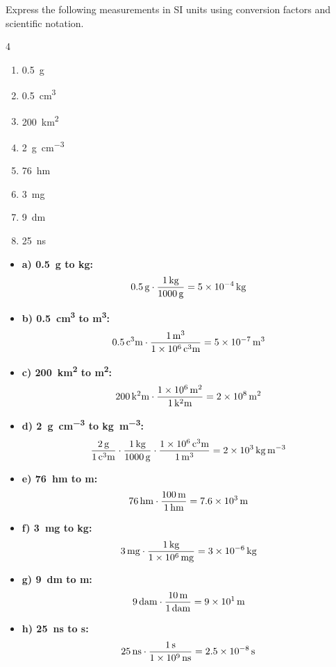 \begin{exercise}
    Express the following measurements in SI units using conversion factors and scientific notation.
    \begin{multicols}{4}
        \begin{enumerate}[label=\letraminuscula]
\item \qty{0.5}{\g}
\item \qty{0.5}{\cubic\centi\metre}
\item \qty{200}{\square\kilo\metre}
\item \qty{2}{\g\per\cubic\centi\metre}
\item \qty{76}{\hecto\m}
\item \qty{3}{\milli\g}
\item \qty{9}{\deca\m}
\item \qty{25}{\nano\s}
        \end{enumerate}
    \end{multicols}

    \begin{solu}
        \begin{itemize}
            \item \textbf{a) \qty{0.5}{\g} to \unit{\kg}:}
            \[ \qty{0.5}{\cancel{\g}} \cdot \frac{\qty{1}{\kg}}{\qty{1000}{\cancel{\g}}} = \qty{5e-4}{\kg} \]
            \item \textbf{b) \qty{0.5}{\cubic\centi\metre} to \unit{\cubic\metre}:}
            \[ \qty{0.5}{\cancel{\cubic\centi\metre}} \cdot \frac{\qty{1}{\cubic\metre}}{\qty{1e6}{\cancel{\cubic\centi\metre}}} = \qty{5e-7}{\cubic\metre} \]
            \item \textbf{c) \qty{200}{\square\kilo\metre} to \unit{\square\metre}:}
            \[ \qty{200}{\cancel{\square\kilo\metre}} \cdot \frac{\qty{1e6}{\square\metre}}{\qty{1}{\cancel{\square\kilo\metre}}} = \qty{2e8}{\square\metre} \]
            \item \textbf{d) \qty{2}{\g\per\cubic\centi\metre} to \unit{\kg\per\cubic\metre}:}
            \[ \frac{\qty{2}{\cancel{\g}}}{\qty{1}{\cancel{\cubic\centi\metre}}} \cdot \frac{\qty{1}{\kg}}{\qty{1000}{\cancel{\g}}} \cdot \frac{\qty{1e6}{\cancel{\cubic\centi\metre}}}{\qty{1}{\cubic\metre}} = \qty{2e3}{\kg\per\cubic\metre} \]
            \item \textbf{e) \qty{76}{\hecto\m} to \unit{\m}:}
            \[ \qty{76}{\cancel{\hecto\m}} \cdot \frac{\qty{100}{\m}}{\qty{1}{\cancel{\hecto\m}}} = \qty{7.6e3}{\m} \]
            \item \textbf{f) \qty{3}{\milli\g} to \unit{\kg}:}
            \[ \qty{3}{\cancel{\milli\g}} \cdot \frac{\qty{1}{\kg}}{\qty{1e6}{\cancel{\milli\g}}} = \qty{3e-6}{\kg} \]
            \item \textbf{g) \qty{9}{\deca\m} to \unit{\m}:}
            \[ \qty{9}{\cancel{\deca\m}} \cdot \frac{\qty{10}{\m}}{\qty{1}{\cancel{\deca\m}}} = \qty{9e1}{\m} \]
            \item \textbf{h) \qty{25}{\nano\s} to \unit{\s}:}
            \[ \qty{25}{\cancel{\nano\s}} \cdot \frac{\qty{1}{\s}}{\qty{1e9}{\cancel{\nano\s}}} = \qty{2.5e-8}{\s} \]
        \end{itemize}
    \end{solu}


\end{exercise}
